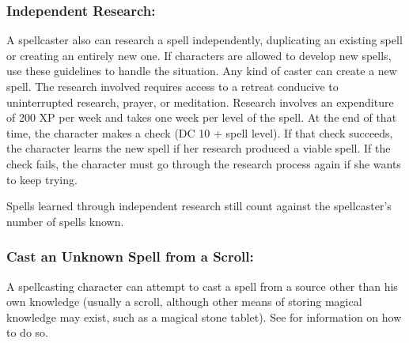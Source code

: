 \subsubsection{Independent Research:} 
A spellcaster also can research a spell independently, duplicating an existing spell or creating an entirely new one. 
If characters are allowed to develop new spells, use these guidelines to handle the situation.
Any kind of caster can create a new spell. 
The research involved requires access to a retreat conducive to uninterrupted research, prayer, or meditation. 
Research involves an expenditure of 200 XP per week and takes one week per level of the spell. 
At the end of that time, the character makes a  check (DC 10 + spell level). 
If that check succeeds, the character learns the new spell if her research produced a viable spell. 
If the check fails, the character must go through the research process again if she wants to keep trying.

Spells learned through independent research still count against the spellcaster's number of spells known.
\subsubsection{Cast an Unknown Spell from a Scroll:}
A spellcasting character can attempt to cast a spell from a source other than his own knowledge (usually a scroll, although other means of storing magical knowledge may exist, such as a magical stone tablet). 
See  for information on how to do so.


% 
